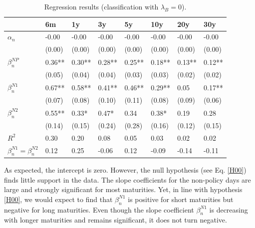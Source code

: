 \documentclass[11pt,a4paper,english,oneside]{book}
\numberwithin{equation}{chapter}
\begin{document}
\begin{table}[h] %
	\centering %
	\begin{tabular}{ p{2cm}  p{1cm} p{1cm} p{1cm} p{1cm} p{1cm} p{1cm} p{1cm} } %
		\toprule %
		& 6m & 1y & 3y & 5y & 10y & 20y & 30y \\
		\midrule %
		$\alpha_n$ & -0.00 & -0.00 & -0.00 & -0.00 & -0.00 & -0.00 & -0.00\\
		& (0.00) & (0.00) & (0.00) & (0.00) & (0.00) & (0.00) & (0.00)\\
		$\beta_n^{NP}$ & 0.36** & 0.30** & 0.28** & 0.25** & 0.18** & 0.13** & 0.12**\\
		& (0.05) & (0.04) & (0.04) & (0.03) & (0.03) & (0.02) & (0.02)\\
		$\beta_n^{N1}$ & 0.67** & 0.58** & 0.41** & 0.46** & 0.29** & 0.05 & 0.17**\\
		& (0.07) & (0.08) & (0.10) & (0.11) & (0.08) & (0.09) & (0.06)\\
		$\beta_n^{N2}$ & 0.55** & 0.33* & 0.47* & 0.34 & 0.38* & 0.19 & 0.28\\
		& (0.14) & (0.15) & (0.24) & (0.28) & (0.16) & (0.12) & (0.15)\\
		$R^2$ & 0.30 & 0.20 & 0.08 & 0.05 & 0.03 & 0.02 & 0.02\\
		$\beta_n^{N1} = \beta_n^{N2}$ & 0.12 & 0.25 & -0.06 & 0.12 & -0.09 & -0.14 & -0.11\\
		\bottomrule %
	\end{tabular}
	\caption{Regression results (classification with $\lambda_B=0$).} %
	\label{tab:reg1} %
\end{table}

As expected, the intercept is zero. However, the null hypothesis (see Eq. \ref{H00}) finds little support in the data. The slope coefficients for the non-policy days are large and strongly significant for most maturities. Yet, in line with hypothesis \ref{H00}, we would expect to find that $\beta_n^{N1}$ is positive for short maturities but negative for long maturities. Even though the slope coefficient $\beta_n^{N1}$ is decreasing with longer maturities and remains significant, it does not turn negative. 
\end{document}
